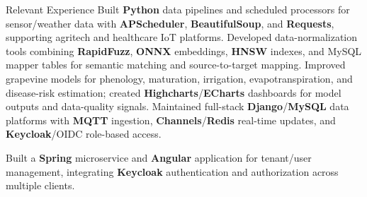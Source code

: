 \begin{rubric}{Relevant Experience}
\entry*%
 Built \textbf{Python} data pipelines and scheduled processors for sensor/weather data with \textbf{APScheduler}, \textbf{BeautifulSoup}, and \textbf{Requests}, supporting agritech and healthcare IoT platforms.
\entry*%
 Developed data-normalization tools combining \textbf{RapidFuzz}, \textbf{ONNX} embeddings, \textbf{HNSW} indexes, and MySQL mapper tables for semantic matching and source-to-target mapping.
\entry*%
 Improved grapevine models for phenology, maturation, irrigation, evapotranspiration, and disease-risk estimation; created \textbf{Highcharts}/\textbf{ECharts} dashboards for model outputs and data-quality signals.
\entry*%
 Maintained full-stack \textbf{Django}/\textbf{MySQL} data platforms with \textbf{MQTT} ingestion, \textbf{Channels}/\textbf{Redis} real-time updates, and \textbf{Keycloak}/OIDC role-based access.

%
\entry*%
 Built a \textbf{Spring} microservice and \textbf{Angular} application for tenant/user management, integrating \textbf{Keycloak} authentication and authorization across multiple clients.
%
\end{rubric}
